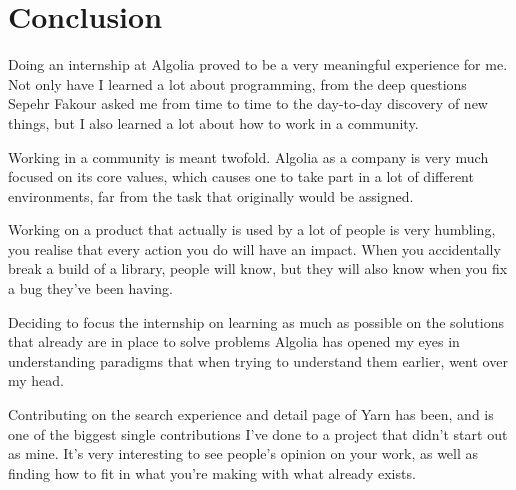 
\chapter{Conclusion} %
\label{chp:conclusion}

Doing an internship at Algolia proved to be a very meaningful experience for me. Not only have I learned a lot about programming, from the deep questions Sepehr Fakour asked me from time to time to the day-to-day discovery of new things, but I also learned a lot about how to work in a community.

Working in a community is meant twofold. Algolia as a company is very much focused on its core values, which causes one to take part in a lot of different environments, far from the task that originally would be assigned.

Working on a product that actually is used by a lot of people is very humbling, you realise that every action you do will have an impact. When you accidentally break a build of a library, people will know, but they will also know when you fix a bug they've been having.

Deciding to focus the internship on learning as much as possible on the solutions that already are in place to solve problems Algolia has opened my eyes in understanding paradigms that when trying to understand them earlier, went over my head.

Contributing on the search experience and detail page of Yarn has been, and is one of the biggest single contributions I've done to a project that didn't start out as mine. It's very interesting to see people's opinion on your work, as well as finding how to fit in what you're making with what already exists.

